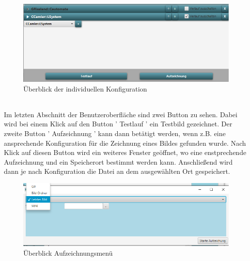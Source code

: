 \documentclass[../mciAusarbeitung.tex]{subfiles}
\begin{document}
        \begin{figure}[H]
\centering
            \includegraphics[width=0.5\linewidth]{"gino/config.png"}

\caption{Überblick der individuellen Konfiguration}
\end{figure}            
        
        $~$ \\Im letzten Abschnitt der Benutzeroberfläche sind zwei Button zu sehen. Dabei wird bei einem Klick auf den Button ' Testlauf ' ein Testbild gezeichnet. Der zweite Button ' Aufzeichnung ' kann dann betätigt werden, wenn z.B. eine ansprechende Konfiguration für die Zeichnung eines Bildes gefunden wurde. Nach Klick auf diesen Button wird ein weiteres Fenster geöffnet, wo eine enstprechende Aufzeichnung und ein Speicherort bestimmt werden kann. Anschließend wird dann je nach Konfiguration die Datei an dem ausgewählten Ort gespeichert.
        
        \begin{figure}[H]
\centering
            \includegraphics[width=0.5\linewidth]{"gino/Aufzeichnung.png"}

\caption{Überblick Aufzeichnungsmenü}
\end{figure}          
\end{document}
